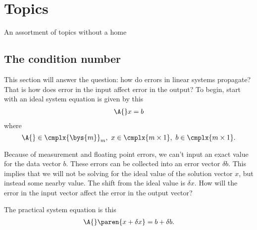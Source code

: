 \chapter[]{Topics}
\label{chap:general}
An assortment of topics without a home

\section{The condition number}
This section will answer the question: how do errors in linear systems propagate? That is how does error in the input affect error in the output? To begin, start with an ideal system equation is given by this
\begin{equation}
  \begin{split}
    \A{} x = b
    \label{eq:t:ideal}
  \end{split}
\end{equation}
where
$$
\A{}\in\cmplx{\bys{m}}_{m},\ x\in\cmplx{m\times1},\ b\in\cmplx{m\times1}.
$$

Because of measurement and floating point errors, we can't input an exact value for the data vector $b$. These errors can be collected into an error vector $\delta b$. This implies that we will not be solving for the ideal value of the solution vector $x$, but instead some nearby value. The shift from the ideal value is $\delta x$. How will the error in the input vector affect the error in the output vector?

The practical system equation is this
\begin{equation}
  \begin{split}
    \A{}\paren{x+\delta x} = b+\delta b.
    \label{eq:t:practical}
  \end{split}
\end{equation}

